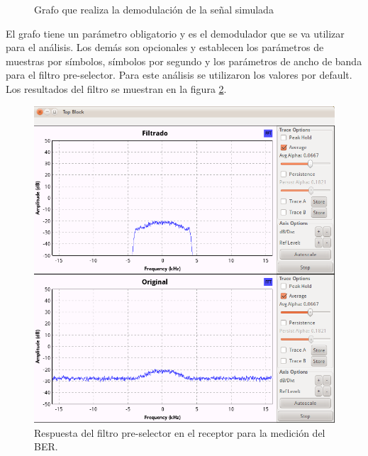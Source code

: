 \begin{figure}[htp]
  \centering
  \vspace{0.3in}
  \vspace{0.3in}
  \caption{Grafo que realiza la demodulaci\'on de la se\~nal simulada}
  \label{fig:analizer}
\end{figure}

El grafo tiene un par\'ametro obligatorio y es el demodulador que se va utilizar para el an\'alisis.
Los dem\'as son opcionales y establecen los par\'ametros de muestras por s\'imbolos, s\'imbolos
por segundo y los par\'ametros de ancho de banda para el filtro pre-selector. Para este an\'alisis
se utilizaron los valores por default. Los resultados del filtro se muestran en la figura
\ref{fig:predetect}.

\begin{figure}[htp]
  \centering
  \includegraphics[scale=0.5]{figs/predetectfilter}
  \vspace{0.3in}
  \caption{Respuesta del filtro pre-selector en el receptor para la medici\'on del BER.}
  \label{fig:predetect}
\end{figure}

